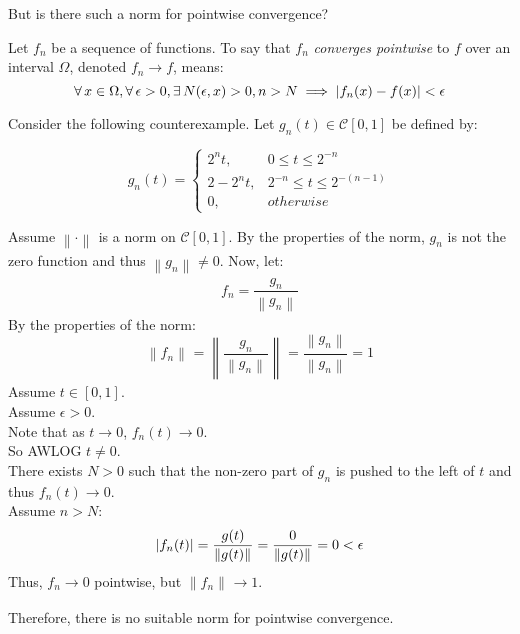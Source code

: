 \documentclass[letterpaper,12pt,fleqn]{article}
\newcommand{\e}{\epsilon}
\renewcommand{\O}{\Omega}
\newcommand{\norm}[2]{\left\|#1\right\|_{#2}}
\newcommand{\cf}{\mathcal{C}}
\begin{document}
\newpage

But is there such a norm for pointwise convergence?

\begin{definition}
  Let $f_n$ be a sequence of functions. To say that $f_n$
  \emph{converges pointwise} to $f$ over an interval $\O$, denoted $f_n\to f$,
  means:
  \[\forall\,x\in\O,\forall\,\e>0,\exists\,N(\e,x)>0,
  n>N\implies\abs{f_n(x)-f(x)}<\e\]
\end{definition}

Consider the following counterexample. Let $g_n(t)\in\cf[0,1]$ be defined by:

\bigskip

\begin{minipage}{3.5in}
  \[g_n(t)=\begin{cases}
  2^nt, & 0\le t\le2^{-n} \\
  2-2^nt, & 2^{-n}\le t\le2^{-(n-1)} \\
  0, & otherwise
  \end{cases}\]
\end{minipage}
\begin{minipage}{3in}
\end{minipage}

Assume $\norm{\cdot}{}$ is a norm on $\cf[0,1]$. By the properties of the norm,
$g_n$ is not the zero function and thus $\norm{g_n}{}\ne0$. Now, let:
\[f_n=\frac{g_n}{\norm{g_n}{}}\]
By the properties of the norm:
\[\norm{f_n}{}=\norm{\frac{g_n}{\norm{g_n}{}}}{}=
\frac{\norm{g_n}{}}{\norm{g_n}{}}=1\]
Assume $t\in[0,1]$. \\
Assume $\e>0$. \\
Note that as $t\to0$, $f_n(t)\to0$. \\
So AWLOG $t\ne0$. \\
There exists $N>0$ such that the non-zero part of $g_n$ is pushed to the left
of $t$ and thus $f_n(t)\to 0$. \\
Assume $n>N$: \\
\[\abs{f_n(t)}=\frac{g(t)}{\norm{g(t)}{}}=\frac{0}{\norm{g(t)}{}}=0<\e\]
Thus, $f_n\to0$ pointwise, but $\norm{f_n}{}\to1$.

Therefore, there is no suitable norm for pointwise convergence.
\end{document}
